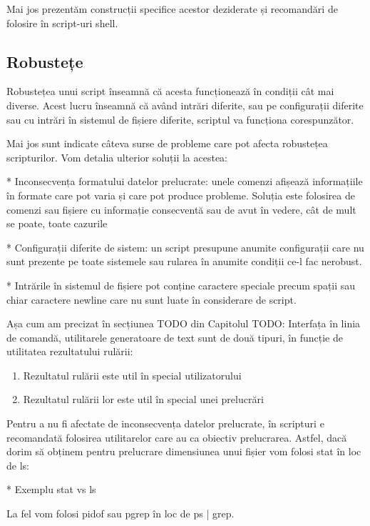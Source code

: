 Mai jos prezentăm construcții specifice acestor deziderate și recomandări de
folosire în script-uri shell.

\subsection{Robustețe}
\label{sec:auto-advancedfunc-robust}

Robustețea unui script înseamnă că acesta funcționează în condiții cât mai
diverse. Acest lucru înseamnă că având intrări diferite, sau pe configurații
diferite sau cu intrări în sistemul de fișiere diferite, scriptul va funcționa
corespunzător.

Mai jos sunt indicate câteva surse de probleme care pot afecta robustețea
scripturilor. Vom detalia ulterior soluții la acestea:

* Inconsecvența formatului datelor prelucrate: unele comenzi afișează
informațiile în formate care pot varia și care pot produce probleme. Soluția
este folosirea de comenzi sau fișiere cu informație consecventă sau de avut în
vedere, cât de mult se poate, toate cazurile

* Configurații diferite de sistem: un script presupune anumite configurații care
nu sunt prezente pe toate sistemele sau rularea în anumite condiții ce-l fac
nerobust.

* Intrările în sistemul de fișiere pot conține caractere speciale precum spații
sau chiar caractere newline care nu sunt luate în considerare de script.

Așa cum am precizat în secțiunea TODO din Capitolul TODO: Interfața în linia de
comandă, utilitarele generatoare de text sunt de două tipuri, în funcție de
utilitatea rezultatului rulării:

\begin{enumerate}
	\item Rezultatul rulării este util în special utilizatorului
	\item Rezultatul rulării lor este util în special unei prelucrări
\end{enumerate}

Pentru a nu fi afectate de inconsecvența datelor prelucrate, în scripturi e
recomandată folosirea utilitarelor care au ca obiectiv prelucrarea. Astfel, dacă
dorim să obținem pentru prelucrare dimensiunea unui fișier vom folosi stat în
loc de ls:

* Exemplu stat vs ls

La fel vom folosi pidof sau pgrep în loc de ps | grep.

